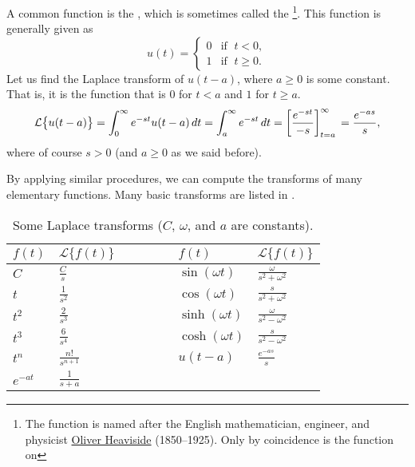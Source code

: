\begin{example}
A common function is the \emph{}, which is
sometimes called the \emph{}%
\footnote{The function is named after the English mathematician, engineer, and
physicist
\href{https://en.wikipedia.org/wiki/Heaviside}{Oliver Heaviside}
(1850--1925).  Only
by coincidence is the function  on }.
This function is generally given as
\begin{equation*}
u(t) = 
\begin{cases}
0 & \text{if } \; t < 0 , \\
1 & \text{if } \; t \geq 0 .
\end{cases}
\end{equation*}
Let us find the Laplace transform of $u(t-a)$, where $a \geq 0$
is some constant.
That is, it is the function that is $0$ for $t < a$ and $1$ for $t \geq a$.
\begin{equation*}
\mathcal{L} \bigl\{ u(t-a) \bigr\}
=
\int_0^{\infty} e^{-st} u(t-a) \, dt
=
\int_a^{\infty} e^{-st} \, dt
=
\left[ \frac{e^{-st}}{-s} \right]_{t=a}^\infty \\
=
\frac{e^{-as}}{s} ,
\end{equation*}
where of course $s > 0$ (and $a \geq 0$ as we said before).
\end{example}

By applying similar procedures, we can compute the transforms of many
elementary functions.  Many basic transforms are listed in
.

\begin{table}[h!t]
\mybeginframe
\capstart
\begin{center}
\begin{tabular}{@{}lllll@{}}
\toprule
$f(t)$ & $\mathcal{L} \bigl\{ f(t) \bigr\}$ & $\qquad\quad$ &
$f(t)$ & $\mathcal{L} \bigl\{ f(t) \bigr\}$ \\
\midrule
$C$ & $\frac{C}{s}$
& &
$\sin (\omega t)$ & $\frac{\omega}{s^2+\omega^2}$
\\[4pt]
$t$ & $\frac{1}{s^2}$
& &
$\cos (\omega t)$ & $\frac{s}{s^2+\omega^2}$
\\[4pt]
$t^2$ & $\frac{2}{s^3}$
& &
$\sinh (\omega t)$ & $\frac{\omega}{s^2-\omega^2}$
\\[4pt]
$t^3$ & $\frac{6}{s^4}$
& &
$\cosh (\omega t)$ & $\frac{s}{s^2-\omega^2}$
\\[4pt]
$t^n$ & $\frac{n!}{s^{n+1}}$
& &
$u(t-a)$ & $\frac{e^{-as}}{s}$
\\[4pt]
$e^{-at}$ & $\frac{1}{s+a}$
& & &
\\[4pt]
\bottomrule
\end{tabular}
\end{center}
\caption{Some Laplace transforms ($C$, $\omega$, and $a$ are
constants).\label{lt:table}}
\myendframe
\end{table}


